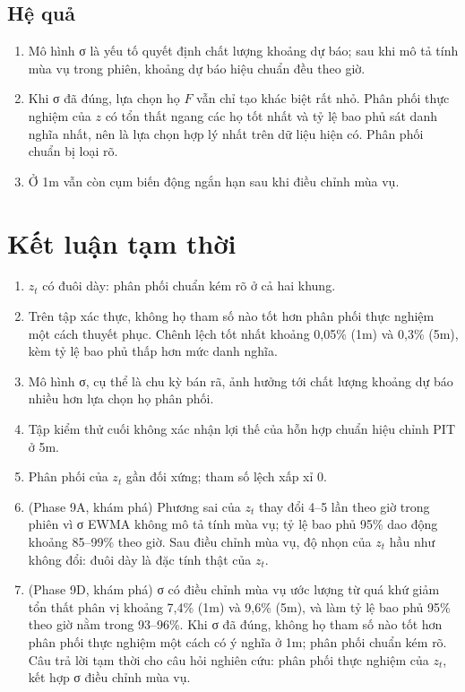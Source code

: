 \documentclass[11pt,a4paper]{article}
\begin{document}
\subsection{Hệ quả}

\begin{enumerate}[nosep]
\item Mô hình σ là yếu tố quyết định chất lượng khoảng dự báo; sau khi mô tả tính mùa vụ trong phiên, khoảng dự báo hiệu chuẩn đều theo giờ.
\item Khi σ đã đúng, lựa chọn họ $F$ vẫn chỉ tạo khác biệt rất nhỏ. Phân phối thực nghiệm của $z$ có tổn thất ngang các họ tốt nhất và tỷ lệ bao phủ sát danh nghĩa nhất, nên là lựa chọn hợp lý nhất trên dữ liệu hiện có. Phân phối chuẩn bị loại rõ.
\item Ở 1m vẫn còn cụm biến động ngắn hạn sau khi điều chỉnh mùa vụ.
\end{enumerate}

\section{Kết luận tạm thời}

\begin{enumerate}[nosep]
\item $z_t$ có đuôi dày: phân phối chuẩn kém rõ ở cả hai khung.
\item Trên tập xác thực, không họ tham số nào tốt hơn phân phối thực nghiệm một cách thuyết phục. Chênh lệch tốt nhất khoảng 0,05\% (1m) và 0,3\% (5m), kèm tỷ lệ bao phủ thấp hơn mức danh nghĩa.
\item Mô hình σ, cụ thể là chu kỳ bán rã, ảnh hưởng tới chất lượng khoảng dự báo nhiều hơn lựa chọn họ phân phối.
\item Tập kiểm thử cuối không xác nhận lợi thế của hỗn hợp chuẩn hiệu chỉnh PIT ở 5m.
\item Phân phối của $z_t$ gần đối xứng; tham số lệch xấp xỉ 0.
\item (Phase 9A, khám phá) Phương sai của $z_t$ thay đổi 4--5 lần theo giờ trong phiên vì σ EWMA không mô tả tính mùa vụ; tỷ lệ bao phủ 95\% dao động khoảng 85--99\% theo giờ. Sau điều chỉnh mùa vụ, độ nhọn của $z_t$ hầu như không đổi: đuôi dày là đặc tính thật của $z_t$.
\item (Phase 9D, khám phá) σ có điều chỉnh mùa vụ ước lượng từ quá khứ giảm tổn thất phân vị khoảng 7,4\% (1m) và 9,6\% (5m), và làm tỷ lệ bao phủ 95\% theo giờ nằm trong 93--96\%. Khi σ đã đúng, không họ tham số nào tốt hơn phân phối thực nghiệm một cách có ý nghĩa ở 1m; phân phối chuẩn kém rõ. Câu trả lời tạm thời cho câu hỏi nghiên cứu: phân phối thực nghiệm của $z_t$, kết hợp σ điều chỉnh mùa vụ.
\end{enumerate}
\end{document}
